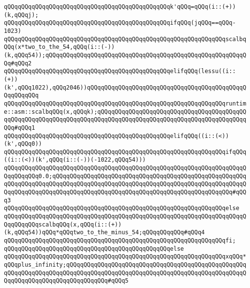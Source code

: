 \verb|qQQqqQQqqQQqqQQqqQQqqQQqqQQqqQQqqQQqqQQqqQQqqQQqk'qQQq=qQQq(i::(+))(k,qQQqj);|\newline
\newline
\verb|qQQqqQQqqQQqqQQqqQQqqQQqqQQqqQQqqQQqqQQqqQQqqQQqifqQQq(jqQQq==qQQq-1023)|\newline
\newline
\verb|qQQqqQQqqQQqqQQqqQQqqQQqqQQqqQQqqQQqqQQqqQQqqQQqqQQqqQQqqQQqqQQqscalbqQQq(x*two_to_the_54,qQQq(i::(-))(k,qQQq54));qQQqqQQqqQQqqQQqqQQqqQQqqQQqqQQqqQQqqQQqqQQqqQQqqQQqqQQqqQQq#qQQq2|\newline
\newline
\verb|qQQqqQQqqQQqqQQqqQQqqQQqqQQqqQQqqQQqqQQqqQQqqQQqelifqQQq(lessu((i::(+))(k',qQQq1022),qQQq2046))qQQqqQQqqQQqqQQqqQQqqQQqqQQqqQQqqQQqqQQqqQQqqQQqqQQqqQQq|\newline
\newline
\verb|qQQqqQQqqQQqqQQqqQQqqQQqqQQqqQQqqQQqqQQqqQQqqQQqqQQqqQQqqQQqqQQqruntime::asm::scalbqQQq(x,qQQqk);qQQqqQQqqQQqqQQqqQQqqQQqqQQqqQQqqQQqqQQqqQQqqQQqqQQqqQQqqQQqqQQqqQQqqQQqqQQqqQQqqQQqqQQqqQQqqQQqqQQqqQQqqQQqqQQqqQQq#qQQq1|\newline
\newline
\verb|qQQqqQQqqQQqqQQqqQQqqQQqqQQqqQQqqQQqqQQqqQQqqQQqelifqQQq((i::(<))(k',qQQq0))|\newline
\newline
\verb|qQQqqQQqqQQqqQQqqQQqqQQqqQQqqQQqqQQqqQQqqQQqqQQqqQQqqQQqqQQqqQQqifqQQq((i::(<))(k',qQQq(i::(-))(-1022,qQQq54)))|\newline
\verb|qQQqqQQqqQQqqQQqqQQqqQQqqQQqqQQqqQQqqQQqqQQqqQQqqQQqqQQqqQQqqQQqqQQqqQQqqQQqqQQq0.0;qQQqqQQqqQQqqQQqqQQqqQQqqQQqqQQqqQQqqQQqqQQqqQQqqQQqqQQqqQQqqQQqqQQqqQQqqQQqqQQqqQQqqQQqqQQqqQQqqQQqqQQqqQQqqQQqqQQqqQQqqQQqqQQqqQQqqQQqqQQqqQQqqQQqqQQqqQQqqQQqqQQqqQQqqQQqqQQqqQQqqQQqqQQqqQQq#qQQq3|\newline
\verb|qQQqqQQqqQQqqQQqqQQqqQQqqQQqqQQqqQQqqQQqqQQqqQQqqQQqqQQqqQQqqQQqelse|\newline
\verb|qQQqqQQqqQQqqQQqqQQqqQQqqQQqqQQqqQQqqQQqqQQqqQQqqQQqqQQqqQQqqQQqqQQqqQQqqQQqqQQqscalbqQQq(x,qQQq(i::(+))(k,qQQq54))qQQq*qQQqtwo_to_the_minus_54;qQQqqQQqqQQq#qQQq4|\newline
\verb|qQQqqQQqqQQqqQQqqQQqqQQqqQQqqQQqqQQqqQQqqQQqqQQqqQQqqQQqqQQqqQQqfi;|\newline
\verb|qQQqqQQqqQQqqQQqqQQqqQQqqQQqqQQqqQQqqQQqqQQqqQQqelse|\newline
\verb|qQQqqQQqqQQqqQQqqQQqqQQqqQQqqQQqqQQqqQQqqQQqqQQqqQQqqQQqqQQqqQQqxqQQq*qQQqplus_infinity;qQQqqQQqqQQqqQQqqQQqqQQqqQQqqQQqqQQqqQQqqQQqqQQqqQQqqQQqqQQqqQQqqQQqqQQqqQQqqQQqqQQqqQQqqQQqqQQqqQQqqQQqqQQqqQQqqQQqqQQqqQQqqQQqqQQqqQQqqQQqqQQqqQQqqQQq#qQQq5|\newline
